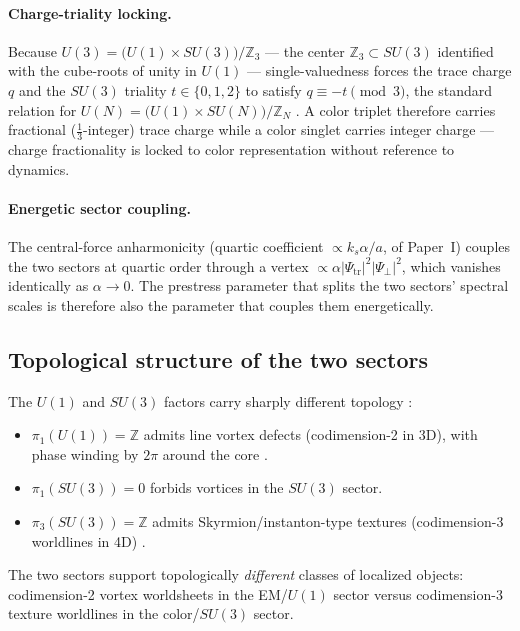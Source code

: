 \paragraph{Charge-triality locking.}
Because $U(3)=\bigl(U(1)\times SU(3)\bigr)/\mathbb{Z}_3$ --- the center $\mathbb{Z}_3\subset SU(3)$
identified with the cube-roots of unity in $U(1)$ --- single-valuedness forces the trace charge $q$
and the $SU(3)$ triality $t\in\{0,1,2\}$ to satisfy $q\equiv -t\pmod{3}$, the standard relation for
$U(N)=\bigl(U(1)\times SU(N)\bigr)/\mathbb{Z}_N$ \citep{GeorgiGlashow1974,BaezHuerta2010GUTAlgebra}.
A color triplet therefore carries fractional ($\tfrac13$-integer) trace charge while a color singlet
carries integer charge --- charge fractionality is locked to color representation without reference to
dynamics.

\paragraph{Energetic sector coupling.}
The central-force anharmonicity (quartic coefficient $\propto k_s\alpha/a$,  of Paper~I)
couples the two sectors at quartic order through a vertex $\propto\alpha|\Psi_{\mathrm{tr}}|^2
|\Psi_\perp|^2$, which vanishes identically as $\alpha\to 0$.
The prestress parameter that splits the two sectors' spectral scales is therefore also the parameter
that couples them energetically.

\subsection{Topological structure of the two sectors}
\label{subsec:topology}

The $U(1)$ and $SU(3)$ factors carry sharply different topology
\citep{Kibble1976Topology,VilenkinShellard1994,MantonSutcliffe2004}:
\begin{itemize}
  \item $\pi_1(U(1))=\mathbb{Z}$ admits line vortex defects (codimension-2 in 3D), with phase
  winding by $2\pi$ around the core \citep{NielsenOlesen1973}.
  \item $\pi_1(SU(3))=0$ forbids vortices in the $SU(3)$ sector.
  \item $\pi_3(SU(3))=\mathbb{Z}$ admits Skyrmion/instanton-type textures (codimension-3 worldlines
  in 4D) \citep{Skyrme1962,AtiyahManton1989}.
\end{itemize}
The two sectors support topologically \emph{different} classes of localized objects: codimension-2
vortex worldsheets in the EM/$U(1)$ sector versus codimension-3 texture worldlines in the
color/$SU(3)$ sector.

